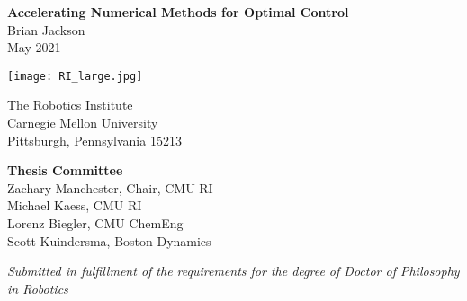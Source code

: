 \begin{titlepage}
    \begin{center}
        \vspace*{1.0in}
        {\Huge \textbf{
        Accelerating 
        Numerical Methods for
        Optimal Control 
        }} \\
        \vspace{0.2in}
        {\Large Brian Jackson} \\
        \vspace{0.2in}
        {\large May 2021}
        
        \vfill
        \texttt{[image: RI\_large.jpg]}

        The Robotics Institute \\
        Carnegie Mellon University \\
        Pittsburgh, Pennsylvania 15213 \\

        \vspace{0.2in}

        \textbf{Thesis Committee}\\
        Zachary Manchester, Chair, CMU RI \\
        Michael Kaess, CMU RI \\
        Lorenz Biegler, CMU ChemEng \\
        Scott Kuindersma, Boston Dynamics \\

        \vspace*{0.5in}

        \textit{Submitted in fulfillment of the requirements for the degree of Doctor of Philosophy in Robotics }\\

    \end{center}
\end{titlepage}